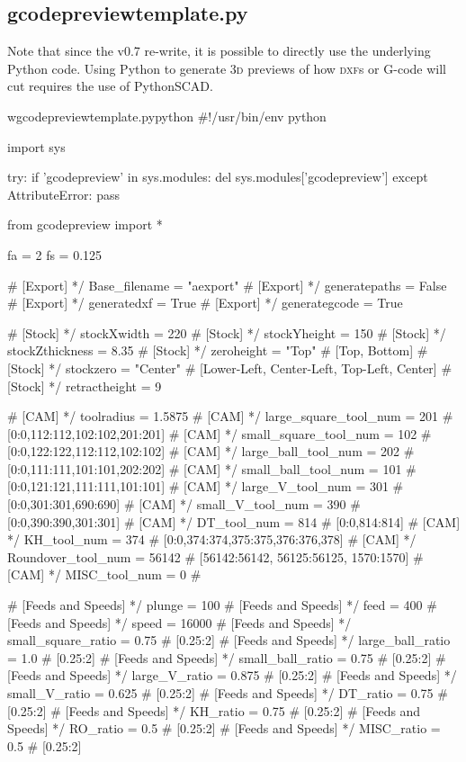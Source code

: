 \documentclass{ltxdoc}
\begin{document}
\subsection{gcodepreviewtemplate.py}
           
Note that since the v0.7 re-write, it is possible to directly use the underlying Python code. Using Python to generate \textsc{3d} previews of how \textsc{dxf}s or G-code will cut requires the use of PythonSCAD.

\lstset{firstnumber=1}%
\begin{writecode}{w}{gcodepreviewtemplate.py}{python}
#!/usr/bin/env python

import sys

try:
    if 'gcodepreview' in sys.modules:
        del sys.modules['gcodepreview']
except AttributeError:
    pass

from gcodepreview import *

fa = 2
fs = 0.125

# [Export] */
Base_filename = "aexport"
# [Export] */
generatepaths = False
# [Export] */
generatedxf = True
# [Export] */
generategcode = True

# [Stock] */
stockXwidth = 220
# [Stock] */
stockYheight = 150
# [Stock] */
stockZthickness = 8.35
# [Stock] */
zeroheight = "Top" # [Top, Bottom]
# [Stock] */
stockzero = "Center" # [Lower-Left, Center-Left, Top-Left, Center]
# [Stock] */
retractheight = 9

# [CAM] */
toolradius = 1.5875
# [CAM] */
large_square_tool_num = 201 # [0:0,112:112,102:102,201:201]
# [CAM] */
small_square_tool_num = 102 # [0:0,122:122,112:112,102:102]
# [CAM] */
large_ball_tool_num = 202 # [0:0,111:111,101:101,202:202]
# [CAM] */
small_ball_tool_num = 101 # [0:0,121:121,111:111,101:101]
# [CAM] */
large_V_tool_num = 301 # [0:0,301:301,690:690]
# [CAM] */
small_V_tool_num = 390 # [0:0,390:390,301:301]
# [CAM] */
DT_tool_num = 814 # [0:0,814:814]
# [CAM] */
KH_tool_num = 374 # [0:0,374:374,375:375,376:376,378]
# [CAM] */
Roundover_tool_num = 56142 # [56142:56142, 56125:56125, 1570:1570]
# [CAM] */
MISC_tool_num = 0 #

# [Feeds and Speeds] */
plunge = 100
# [Feeds and Speeds] */
feed = 400
# [Feeds and Speeds] */
speed = 16000
# [Feeds and Speeds] */
small_square_ratio = 0.75 # [0.25:2]
# [Feeds and Speeds] */
large_ball_ratio = 1.0 # [0.25:2]
# [Feeds and Speeds] */
small_ball_ratio = 0.75 # [0.25:2]
# [Feeds and Speeds] */
large_V_ratio = 0.875 # [0.25:2]
# [Feeds and Speeds] */
small_V_ratio = 0.625 # [0.25:2]
# [Feeds and Speeds] */
DT_ratio = 0.75 # [0.25:2]
# [Feeds and Speeds] */
KH_ratio = 0.75 # [0.25:2]
# [Feeds and Speeds] */
RO_ratio = 0.5 # [0.25:2]
# [Feeds and Speeds] */
MISC_ratio = 0.5 # [0.25:2]


\end{writecode}
\end{document}
